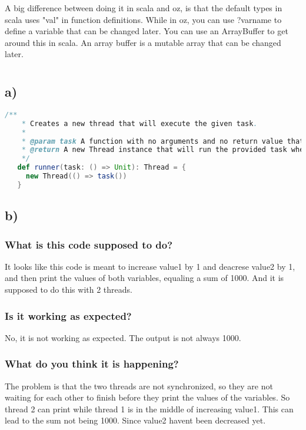 \documentclass[11pt,a4paper]{report}
\begin{document}
A big difference between doing it in scala and oz, is that the default types in scala uses "val" in function definitions.
While in oz, you can use ?varname to define a variable that can be changed later.
You can use an ArrayBuffer to get around this in scala. An array buffer is a mutable array that can be changed later.

\section{}
\subsection{a)}
\begin{lstlisting}[language=scala]
    /**
    * Creates a new thread that will execute the given task.
    *
    * @param task A function with no arguments and no return value that represents the task to be executed.
    * @return A new Thread instance that will run the provided task when started.
    */
   def runner(task: () => Unit): Thread = {
     new Thread(() => task())
   }
\end{lstlisting}
\subsection{b)}
\subsubsection{What is this code supposed to do?}
It looks like this code is meant to increase value1 by 1 and deacrese value2 by 1, and then print the values of both variables,
equaling a sum of 1000. And it is supposed to do this with 2 threads.

\subsubsection{Is it working as expected?}
No, it is not working as expected. The output is not always 1000.

\subsubsection{What do you think it is happening?}
The problem is that the two threads are not synchronized, so they are not waiting for each other to finish before they print the values of the variables.
So thread 2 can print while thread 1 is in the middle of increasing value1. This can lead to the sum not being 1000. Since value2 havent been decreased yet. 
\end{document}
